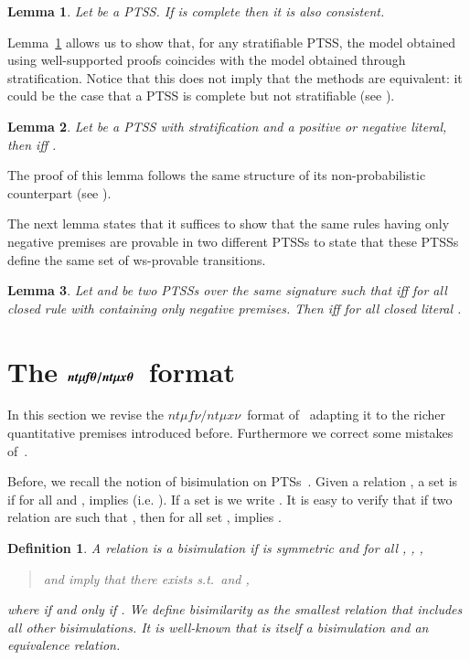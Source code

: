 \documentclass[submission,copyright,creativecommons]{eptcs}
\newtheorem{definition}{Definition}
\newtheorem{lemma}{Lemma}
\newcommand{\ntmufnu}{\ensuremath{\textit{nt}\mu\textit{f}\nu}}
\newcommand{\ntmuxnu}{\ensuremath{\textit{nt}\mu\textit{x}\nu}}
\newcommand{\ntmufxnu}{\ensuremath{\ntmufnu\textit{/}\ntmuxnu}}
\newcommand{\bntmuft}{\ensuremath{\textit{\bfseries nt}\boldmath\mu\textit{\bfseries f}\boldmath\theta}}
\newcommand{\bntmuxt}{\ensuremath{\textit{\bfseries nt}\boldmath\mu\textit{\bfseries x}\boldmath\theta}}
\newcommand{\bntmufxt}{\ensuremath{\bntmuft/\bntmuxt}}
\begin{document}
\begin{lemma}\label{lemma:completeThenCons}
 Let  be a PTSS. If  is complete then it is also consistent.
\end{lemma}

 Lemma~\ref{lemma:completeThenCons} allows us to show that, for any stratifiable PTSS, the model obtained using well-supported proofs coincides with the model obtained through stratification. 
Notice that this does not imply that the methods are equivalent: it could be the case
 that a PTSS is complete but not stratifiable (see \cite[Prop. 27]{vanGlabbeek04}).


\begin{lemma}\label{lemma:WSPsubsumesStra}
 Let  be a PTSS with stratification  and  a positive or negative literal, 
 then   iff .
\end{lemma}

The proof of this lemma follows the same structure of its non-probabilistic counterpart (see \cite[Prop. 25]{vanGlabbeek04}).


The next lemma states that it suffices to show that the same rules
having only negative premises are provable in two different PTSSs to
state that these PTSSs define the same set of ws-provable transitions.


\begin{lemma}\label{lemma:sameNegRules}
 Let  and  be two PTSSs over the same signature such that
  iff  for all closed rule  with  containing only negative premises.  Then  
  iff  for all closed literal . 
\end{lemma}
  

\section{The \bntmufxt\  format}


In this section we revise the \ntmufxnu\ format of~\cite{DL-fossacs12}
adapting it to the richer quantitative premises introduced before.
Furthermore we correct some mistakes of~\cite{DL-fossacs12}.

Before, we recall the notion of bisimulation on PTSs~\cite{LarsenSkou91}. 
Given a relation ,
a set  is  if for all  and ,  implies 
(i.e. ).
If a set  is  we write .
It is easy to verify that if two relation  are such that
, then for all set ,  implies .

\begin{definition}
  A relation  is a
  bisimulation if  is symmetric and for all , , ,
\begin{quote}
     and  imply that there exists
     s.t.\  and
    ,
  \end{quote}
where  if and only if .
We define bisimilarity  as the smallest relation that
  includes all other bisimulations.
It is well-known that  is itself a bisimulation and an
  equivalence relation.
\end{definition}
\end{document}
